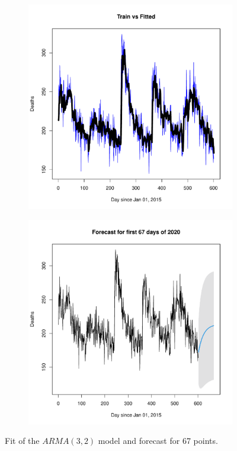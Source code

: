 \documentclass[11pt,a4paper,final]{paper}
\begin{document}
\begin{figure}[h]
	\begin{subfigure}[b]{0.49\textwidth}
	\includegraphics[width=\textwidth]{../images/fit.pdf}
	\end{subfigure}
	\begin{subfigure}[b]{0.49\textwidth}
	\includegraphics[width=\textwidth]{../images/forecast.pdf}
	\end{subfigure}	
	\caption{Fit of the $ARMA(3,2)$ model and forecast for 67 points.}
	\label{fig:fit_for}
\end{figure}
\end{document}
